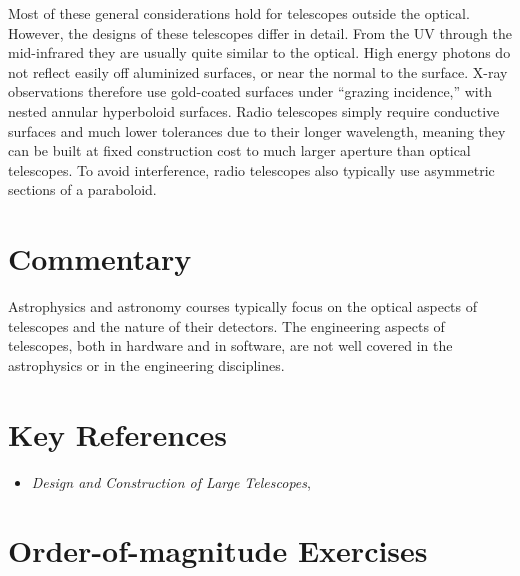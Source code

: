 Most of these general considerations hold for telescopes outside the
optical. However, the designs of these telescopes differ in
detail. From the UV through the mid-infrared they are usually quite
similar to the optical. High energy photons do not reflect easily off
aluminized surfaces, or near the normal to the surface. X-ray
observations therefore use gold-coated surfaces under ``grazing
incidence,'' with nested annular hyperboloid surfaces. Radio
telescopes simply require conductive surfaces and much lower
tolerances due to their longer wavelength, meaning they can be built
at fixed construction cost to much larger aperture than optical
telescopes. To avoid interference, radio telescopes also typically use
asymmetric sections of a paraboloid.

\section{Commentary}

Astrophysics and astronomy courses typically focus on the optical
aspects of telescopes and the nature of their detectors.  The
engineering aspects of telescopes, both in hardware and in software,
are not well covered in the astrophysics or in the engineering
disciplines.

\section{Key References}

\begin{itemize}
  \item
    {\it Design and Construction of Large Telescopes},
      \citet{bely03a}
\end{itemize}

\section{Order-of-magnitude Exercises}

